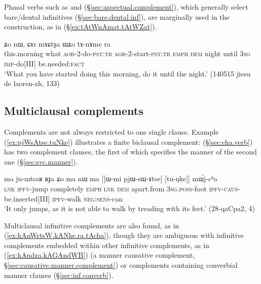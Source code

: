 Phasal verbs such as  and  (§\ref{sec:aspectual.complement}), which generally select bare/dental infinitives (§\ref{sec:bare.dental.inf}), are marginally used in the construction, as in (§\ref{ex:tAtWnAmat.tAtWZat}).  
 
\begin{exe}
\ex \label{ex:tAtWnAmat.tAtWZat}
  ʑo nɯ, ɕɤr mɤɕtʂa ɯʑo tɤ-nɤme ra \\
 this.morning what \textsc{aor}-2-do-\textsc{pst}:\textsc{tr} \textsc{aor}-2-start-\textsc{pst}:\textsc{tr} \textsc{emph} \textsc{dem} night until \textsc{3sg} \textsc{imp}-do[III] be.needed:\textsc{fact} \\
\glt `What you have started doing this morning, do it until the night.' (140515 jiesu de laoren-zh, 133)
\end{exe}

\subsection{Multiclausal complements} \label{sec:multiclausal.complements}
Complements are not always restricted to one single clause. Example (\ref{ex:pjWsAtse.tuNke}) illustrates a finite biclausal complement:  (§\ref{sec:cha.verb}) has two complement clauses, the first of which  specifies the manner of the second one (§\ref{sec:svc.manner}).

\begin{exe}
\ex \label{ex:pjWsAtse.tuNke}
\gll ma ju-mtsaʁ ʁɟa ʑo ma nɯ ma [[ɯ-mi pjɯ-sɯ-ɤtse] [tu-ŋke]] mɯ́j-cʰa\\
\textsc{lnk} \textsc{ipfv}-jump completely \textsc{emph} \textsc{lnk} \textsc{dem} apart.from \textsc{3sg}.\textsc{poss}-foot \textsc{ipfv}-\textsc{caus}-be.inserted[III] \textsc{ipfv}-walk \textsc{neg}:\textsc{sens}-can \\
\glt `It only jumps, as it is not able to walk by treading with its feet.'  (28-qaCpa2, 4)
\end{exe} 

Multiclausal infinitive complements are also found, as in (\ref{ex:kAnWrtsW.kANke.ra.tAcha}), though they are ambiguous with infinitive complements embedded within other infinitive complements, as in (\ref{ex:kAndza.kAGAndWB}) (a manner causative complement, §\ref{sec:causative.manner.complement}) or complements containing converbial manner clauses (§\ref{sec:inf.converb}).


